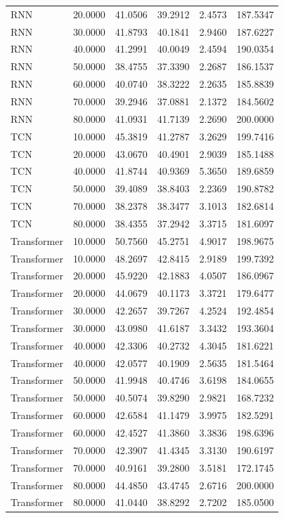 \begin{tabular}{lrrrrr}
RNN & 20.0000 & 41.0506 & 39.2912 & 2.4573 & 187.5347 \\
RNN & 30.0000 & 41.8793 & 40.1841 & 2.9460 & 187.6227 \\
RNN & 40.0000 & 41.2991 & 40.0049 & 2.4594 & 190.0354 \\
RNN & 50.0000 & 38.4755 & 37.3390 & 2.2687 & 186.1537 \\
RNN & 60.0000 & 40.0740 & 38.3222 & 2.2635 & 185.8839 \\
RNN & 70.0000 & 39.2946 & 37.0881 & 2.1372 & 184.5602 \\
RNN & 80.0000 & 41.0931 & 41.7139 & 2.2690 & 200.0000 \\
TCN & 10.0000 & 45.3819 & 41.2787 & 3.2629 & 199.7416 \\
TCN & 20.0000 & 43.0670 & 40.4901 & 2.9039 & 185.1488 \\
TCN & 40.0000 & 41.8744 & 40.9369 & 5.3650 & 189.6859 \\
TCN & 50.0000 & 39.4089 & 38.8403 & 2.2369 & 190.8782 \\
TCN & 70.0000 & 38.2378 & 38.3477 & 3.1013 & 182.6814 \\
TCN & 80.0000 & 38.4355 & 37.2942 & 3.3715 & 181.6097 \\
Transformer & 10.0000 & 50.7560 & 45.2751 & 4.9017 & 198.9675 \\
Transformer & 10.0000 & 48.2697 & 42.8415 & 2.9189 & 199.7392 \\
Transformer & 20.0000 & 45.9220 & 42.1883 & 4.0507 & 186.0967 \\
Transformer & 20.0000 & 44.0679 & 40.1173 & 3.3721 & 179.6477 \\
Transformer & 30.0000 & 42.2657 & 39.7267 & 4.2524 & 192.4854 \\
Transformer & 30.0000 & 43.0980 & 41.6187 & 3.3432 & 193.3604 \\
Transformer & 40.0000 & 42.3306 & 40.2732 & 4.3045 & 181.6221 \\
Transformer & 40.0000 & 42.0577 & 40.1909 & 2.5635 & 181.5464 \\
Transformer & 50.0000 & 41.9948 & 40.4746 & 3.6198 & 184.0655 \\
Transformer & 50.0000 & 40.5074 & 39.8290 & 2.9821 & 168.7232 \\
Transformer & 60.0000 & 42.6584 & 41.1479 & 3.9975 & 182.5291 \\
Transformer & 60.0000 & 42.4527 & 41.3860 & 3.3836 & 198.6396 \\
Transformer & 70.0000 & 42.3907 & 41.4345 & 3.3130 & 190.6197 \\
Transformer & 70.0000 & 40.9161 & 39.2800 & 3.5181 & 172.1745 \\
Transformer & 80.0000 & 44.4850 & 43.4745 & 2.6716 & 200.0000 \\
Transformer & 80.0000 & 41.0440 & 38.8292 & 2.7202 & 185.0500 \\
\bottomrule
\end{tabular}
